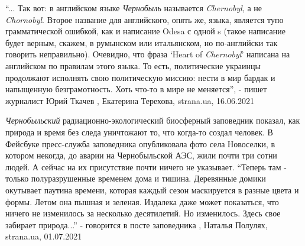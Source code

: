 \enquote{... Так вот: в английском языке \emph{Чернобыль} называется \emph{Chernobyl}, а не \emph{Chornobyl}.
Второе название для английского, опять же, языка, является тупо грамматической
ошибкой, как и написание Odesa с одной s (такое написание будет верным, скажем,
в румынском или итальянском, но по-английски так говорить неправильно).
Очевидно, что фраза \enquote{Heart of \emph{Chernobyl}} написана на английском по правилам
этого языка.  То есть, политические украинцы продолжают исполнять свою
политическую миссию: нести в мир бардак и напыщенную безграмотность.  Хоть
что-то в мире не меняется}, - пишет журналист Юрий Ткачев
, 
Екатерина Терехова, strana.ua, 16.06.2021

\emph{Чернобыльский} радиационно-экологический биосферный заповедник показал,
как природа и время без следа уничтожают то, что когда-то создал человек.  В
Фейсбуке пресс-служба заповедника опубликовала фото села Новоселки, в котором
некогда, до аварии на Чернобыльской АЭС, жили почти три сотни людей. А сейчас
на их присутствие почти ничего не указывает. \enquote{Теперь там - только
полуразрушенные временем дома и тишина. Деревянные домики окутывает паутина
времени, которая каждый сезон маскируется в разные цвета и формы. Летом она
пышная и зеленая. Издалека даже может показаться, что ничего не изменилось за
несколько десятилетий. Но изменилось. Здесь свое забирает природа...} -
говорится в посте заповедника
, 
Наталья Полулях, strana.ua, 01.07.2021

